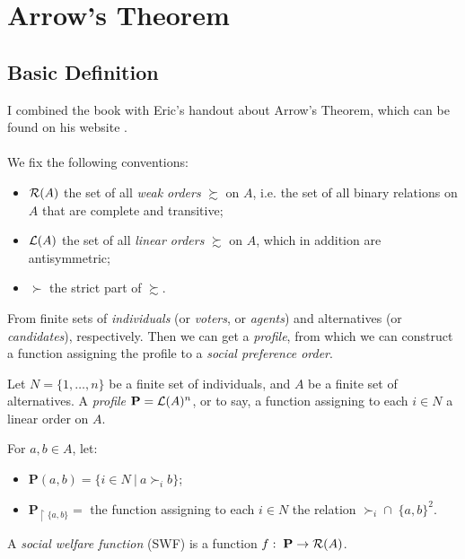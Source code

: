 \chapter{Arrow's Theorem}

\section{Basic Definition}

I combined the book with Eric's handout about Arrow's Theorem, which can be found on his website \parencite{pacuit_socialchoice_2022}.\\
~\\
We fix the following conventions:
\begin{itemize}
    \item $\mathcal{R}(A)$ the set of all \textit{weak orders} $\succsim$ on $A$, i.e. the set of all binary relations on $A$ that are complete and transitive;
    \item $\mathcal{L}(A)$ the set of all \textit{linear orders} $\succsim$ on $A$, which in addition are antisymmetric;
    \item $\succ$ the strict part of $\succsim$.
\end{itemize}

From finite sets of \textit{individuals} (or \textit{voters}, or \textit{agents}) and alternatives (or \textit{candidates}), respectively. Then we can get a \textit{profile}, from which we can construct a function assigning the profile to a \textit{social preference order}.

\begin{definition}[Profile]
    Let $N = \{1, \dots, n\}$ be a finite set of individuals, and $A$ be a finite set of alternatives. A \textit{profile} $\mathbf{P} = \mathcal{L}(A)^n$, or to say, a function assigning to each $i \in N$ a linear order on $A$.
\end{definition}

For $a,b \in A$, let:
\begin{itemize}
    \item $\mathbf{P}(a,b) = \{i \in N\ |\ a \succ_i b\}$;
    \item $\mathbf{P}_{\upharpoonright\{a,b\}} = $ the function assigning to each $i \in N$ the relation $\succ_i \cap \;\{a,b\}^2$.
\end{itemize}

\begin{definition}
    A \textit{social welfare function} (SWF) is a function $f: \; \mathbf{P} \to \mathcal{R}(A)$. 
\end{definition}

